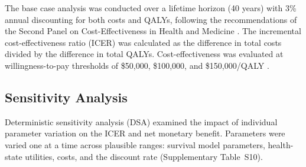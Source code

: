 \documentclass[12pt,a4paper]{article}
\begin{document}
The base case analysis was conducted over a lifetime horizon (40 years) with 3\% annual discounting for both costs and QALYs, following the recommendations of the Second Panel on Cost-Effectiveness in Health and Medicine \cite{sanders2016}. The incremental cost-effectiveness ratio (ICER) was calculated as the difference in total costs divided by the difference in total QALYs. Cost-effectiveness was evaluated at willingness-to-pay thresholds of \$50,000, \$100,000, and \$150,000/QALY \cite{neumann2014}.

\subsection{Sensitivity Analysis}

Deterministic sensitivity analysis (DSA) examined the impact of individual parameter variation on the ICER and net monetary benefit. Parameters were varied one at a time across plausible ranges: survival model parameters, health-state utilities, costs, and the discount rate (Supplementary Table~S10).
\end{document}
